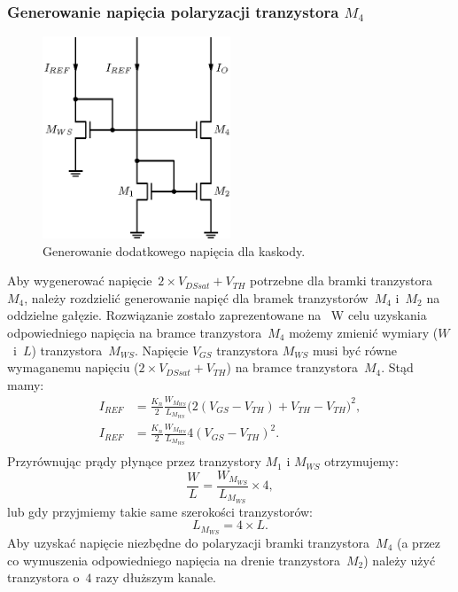\documentclass[twoside,pl,final]{labman}
\begin{document}
\subsubsection{Generowanie napięcia polaryzacji tranzystora $M_4$}
\label{cascode:wideswing:mws}

\begin{figure}[!htbp]
  \centering
  \includegraphics[width=0.5\textwidth]{cascode_gen}
  \caption{Generowanie dodatkowego napięcia dla kaskody.}
  \label{fig:cascode:wideswing:gen}
\end{figure}

Aby wygenerować napięcie~$2 \times V_{DSsat} + V_{TH}$ potrzebne
dla bramki tranzystora~$M_4$, należy rozdzielić generowanie napięć dla bramek
tranzystorów~$M_4$ i~$M_2$ na oddzielne gałęzie.
Rozwiązanie zostało zaprezentowane na~
W celu uzyskania odpowiedniego napięcia na bramce tranzystora~$M_4$
możemy zmienić wymiary ($W$~i~$L$) tranzystora~$M_{WS}$.
Napięcie $V_{GS}$ tranzystora $M_{WS}$ musi być równe wymaganemu
napięciu ($2 \times V_{DSsat} + V_{TH}$) na bramce tranzystora~$M_4$.
Stąd mamy:
\begin{align}
  I_{REF} &= \frac{K_n}{2} \frac{W_{M_{WS}}}{L_{M_{WS}}}
    \big(2 ( V_{GS} - V_{TH}) + V_{TH} - V_{TH} \big)^2, \nonumber \\
  I_{REF} &= \frac{K_n}{2} \frac{W_{M_{WS}}}{L_{M_{WS}}}
    4 ( V_{GS} - V_{TH} )^2. \nonumber \\
\end{align}
Przyrównując prądy płynące przez tranzystory $M_1$ i $M_{WS}$ otrzymujemy:
\begin{equation}
  \frac{W}{L} = \frac{W_{M_{WS}}}{L_{M_{WS}}} \times 4,
\end{equation}
lub gdy przyjmiemy takie same szerokości tranzystorów:
\begin{equation}
  L_{M_{WS}} = 4 \times L.
\end{equation}
Aby uzyskać napięcie niezbędne do polaryzacji bramki tranzystora~$M_4$
(a przez co wymuszenia odpowiedniego napięcia na drenie tranzystora~$M_2$)
należy użyć tranzystora o~$4$ razy dłuższym kanale.
\end{document}
